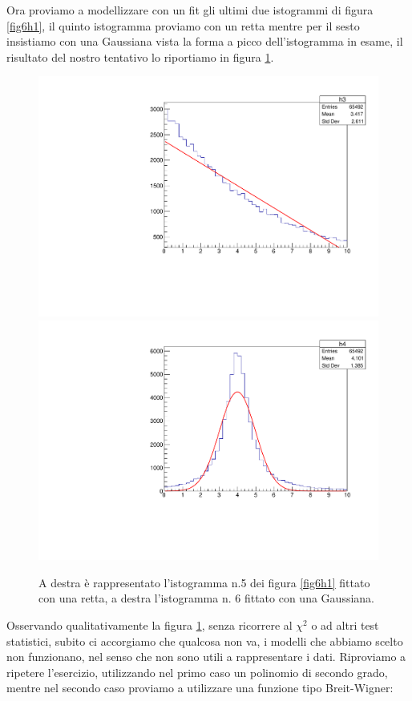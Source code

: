 \documentclass[11pt,fleqn]{book} %
\begin{document}
Ora proviamo a modellizzare con un fit gli ultimi due istogrammi di figura \ref{fig6h1}, il quinto istogramma proviamo con un retta mentre per il sesto insistiamo con una Gaussiana vista la forma a picco dell'istogramma in esame,
il risultato del nostro tentativo lo riportiamo in figura \ref{fitbabbo2}.

\begin{figure}[h]
\centering
\includegraphics[scale=0.35]{Pictures/fitexpsbagliato.pdf}
\includegraphics[scale=0.35]{Pictures/fitgaussbagliato.pdf}
\caption{A destra è rappresentato l'istogramma n.5 dei figura \ref{fig6h1} fittato con una retta, a destra l'istogramma n. 6 fittato con una Gaussiana. \label{fitbabbo2}}
\end{figure}

Osservando qualitativamente la figura \ref{fitbabbo2}, senza ricorrere al $\chi^2$ o ad altri test statistici, subito ci accorgiamo che qualcosa non va, i modelli che abbiamo scelto non funzionano, nel senso che non sono utili a rappresentare i dati.
Riproviamo a ripetere l'esercizio, utilizzando nel primo caso un polinomio di secondo grado, mentre nel secondo caso proviamo a utilizzare una funzione tipo Breit-Wigner:
\end{document}
